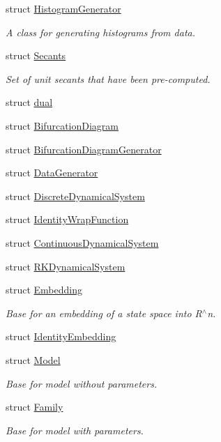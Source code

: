\begin{DoxyCompactItemize}
struct \hyperlink{struct_d_r_d_s_p_1_1_histogram_generator}{Histogram\-Generator}
\begin{DoxyCompactList}\small\item\em A class for generating histograms from data. \end{DoxyCompactList}\item 
struct \hyperlink{struct_d_r_d_s_p_1_1_secants}{Secants}
\begin{DoxyCompactList}\small\item\em Set of unit secants that have been pre-\/computed. \end{DoxyCompactList}\item 
struct \hyperlink{struct_d_r_d_s_p_1_1dual}{dual}
\item 
struct \hyperlink{struct_d_r_d_s_p_1_1_bifurcation_diagram}{Bifurcation\-Diagram}
\item 
struct \hyperlink{struct_d_r_d_s_p_1_1_bifurcation_diagram_generator}{Bifurcation\-Diagram\-Generator}
\item 
struct \hyperlink{struct_d_r_d_s_p_1_1_data_generator}{Data\-Generator}
\item 
struct \hyperlink{struct_d_r_d_s_p_1_1_discrete_dynamical_system}{Discrete\-Dynamical\-System}
\item 
struct \hyperlink{struct_d_r_d_s_p_1_1_identity_wrap_function}{Identity\-Wrap\-Function}
\item 
struct \hyperlink{struct_d_r_d_s_p_1_1_continuous_dynamical_system}{Continuous\-Dynamical\-System}
\item 
struct \hyperlink{struct_d_r_d_s_p_1_1_r_k_dynamical_system}{R\-K\-Dynamical\-System}
\item 
struct \hyperlink{struct_d_r_d_s_p_1_1_embedding}{Embedding}
\begin{DoxyCompactList}\small\item\em Base for an embedding of a state space into R$^\wedge$n. \end{DoxyCompactList}\item 
struct \hyperlink{struct_d_r_d_s_p_1_1_identity_embedding}{Identity\-Embedding}
\item 
struct \hyperlink{struct_d_r_d_s_p_1_1_model}{Model}
\begin{DoxyCompactList}\small\item\em Base for model without parameters. \end{DoxyCompactList}\item 
struct \hyperlink{struct_d_r_d_s_p_1_1_family}{Family}
\begin{DoxyCompactList}\small\item\em Base for model with parameters. \end{DoxyCompactList}\item 

\end{DoxyCompactItemize}
